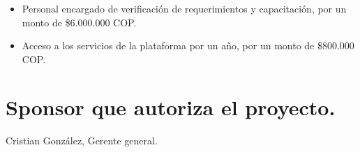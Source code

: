 \begin{itemize}
	\item Personal encargado de verificaci\'on de requerimientos y capacitaci\'on, por un monto
	de \$6.000.000 COP.
	
	\item Acceso a los servicios de la plataforma por un a\~no, por un monto de \$800.000 COP.
\end{itemize}
\chapter{Sponsor que autoriza el proyecto.}
%
Cristian Gonz\'alez, Gerente general.
